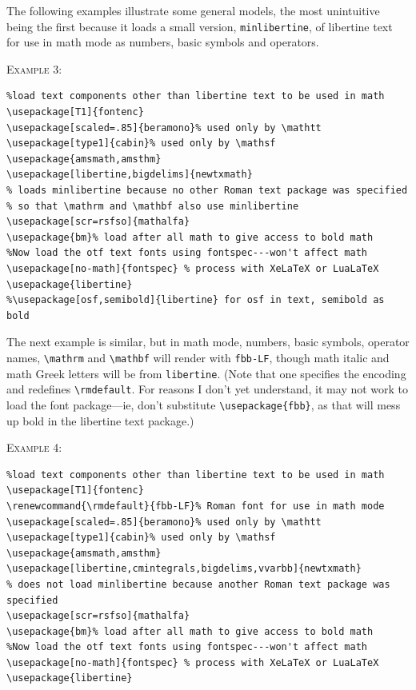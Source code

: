 \documentclass[11pt]{article}
\begin{document}
The following examples illustrate some general models, the most unintuitive being the first because it loads a small version, {\tt minlibertine}, of libertine text for use in math mode as numbers, basic symbols and operators.

\textsc{Example 3:}
\begin{verbatim}
%load text components other than libertine text to be used in math
\usepackage[T1]{fontenc}
\usepackage[scaled=.85]{beramono}% used only by \mathtt
\usepackage[type1]{cabin}% used only by \mathsf
\usepackage{amsmath,amsthm}
\usepackage[libertine,bigdelims]{newtxmath}
% loads minlibertine because no other Roman text package was specified
% so that \mathrm and \mathbf also use minlibertine
\usepackage[scr=rsfso]{mathalfa}
\usepackage{bm}% load after all math to give access to bold math
%Now load the otf text fonts using fontspec---won't affect math
\usepackage[no-math]{fontspec} % process with XeLaTeX or LuaLaTeX
\usepackage{libertine}
%\usepackage[osf,semibold]{libertine} for osf in text, semibold as bold
\end{verbatim}
The next example is similar, but in math mode, numbers, basic symbols, operator names, \verb|\mathrm| and \verb|\mathbf| will render with {\tt fbb-LF}, though  math italic and math Greek letters will be from {\tt libertine}. (Note that one specifies the encoding and redefines \verb|\rmdefault|. For reasons I don't yet understand, it may not work to load the font package---ie, don't substitute \verb|\usepackage{fbb}|, as that will mess up bold in the libertine text package.) 

\textsc{Example 4:}
\begin{verbatim}
%load text components other than libertine text to be used in math
\usepackage[T1]{fontenc}
\renewcommand{\rmdefault}{fbb-LF}% Roman font for use in math mode
\usepackage[scaled=.85]{beramono}% used only by \mathtt
\usepackage[type1]{cabin}% used only by \mathsf
\usepackage{amsmath,amsthm}
\usepackage[libertine,cmintegrals,bigdelims,vvarbb]{newtxmath}
% does not load minlibertine because another Roman text package was specified
\usepackage[scr=rsfso]{mathalfa}
\usepackage{bm}% load after all math to give access to bold math
%Now load the otf text fonts using fontspec---won't affect math
\usepackage[no-math]{fontspec} % process with XeLaTeX or LuaLaTeX
\usepackage{libertine}
\end{verbatim}
\end{document}
